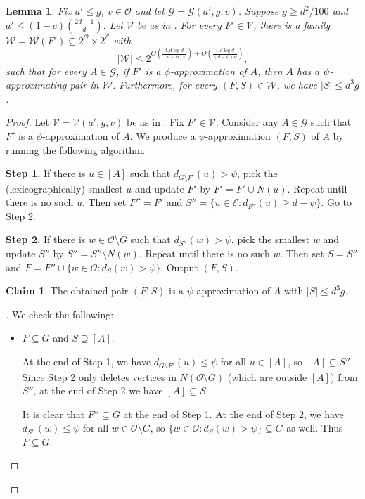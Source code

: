 \documentclass{amsart}
\newenvironment{subproof}[1][\proofname]{
  \renewcommand{\qedsymbol}{$\blacksquare$}
  \begin{proof}[#1]
}{
  \end{proof}
}
\newtheorem{lem}[thm]{Lemma}
\theoremstyle{definition}
\newtheorem{claim}[thm]{Claim}
\newcommand{\cO}{\mathcal{O} }
\newcommand{\cE}{\mathcal{E} }
\newcommand{\cG}{\mathcal{G} }
\newcommand{\cV}{\mathcal{V} }
\newcommand{\cW}{\mathcal{W} }
\newcommand{\0}[0]{\emptyset}
\begin{document}
\begin{lem}\label{lem:psi-approx}
Fix $a'\leq g$, $v\in\cO$ and let $\cG=\cG(a',g,v)$.
Suppose $g\geq d^2/100$ and $a'\leq (1-c)\binom{2d-1}{d}$.
Let $\cV$ be as in . For every $F'\in\mathcal V$, there is a family $\mathcal W=\mathcal W(F')\subseteq 2^{\cO}\times 2^\cE$ with
    \[
    |\mathcal W|\leq 2^{O\left(\frac{t_1d\log d}{(d-\phi)\psi}\right)+O\left(\frac{t_1d\log d}{(d-\psi)\psi}\right)},
    \]
    such that for every $A\in\mathcal G$, if $F'$ is a $\phi$-approximation of $A$, then $A$ has a $\psi$-approximating pair in $\mathcal W$. Furthermore, for every $(F,S)\in\cW$, we have $|S|\leq d^3g$.
\end{lem}
\begin{proof}
Let $\cV=\cV(a',g,v)$ be as in . Fix $F'\in\cV$. Consider any $A\in\cG$ such that $F'$ is a $\phi$-approximation of $A$. We produce a $\psi$-approximation $(F,S)$ of $A$ by running the following algorithm.

\textbf{Step 1.} If there is $u\in[A]$ such that $d_{G\setminus F'}(u)>\psi$, pick the (lexicographically) smallest $u$ and update $F'$ by $F'=F'\cup N(u)$. Repeat until there is no such $u$. Then set $F''=F'$ and $S''=\{u\in \cE:d_{F''}(u)\geq d-\psi\}$. Go to Step 2. 

\textbf{Step 2.} If there is $w\in \cO\setminus G$ such that $d_{S''}(w)>\psi$, pick the smallest $w$ and update $S''$ by $S''=S''\setminus N(w)$. Repeat until there is no such $w$. Then set $S=S''$ and $F=F''\cup \{w\in \cO: d_{S}(w)>\psi\}$. Output $(F,S)$.

\begin{claim}\label{claim:psi-1}
    The obtained pair $(F,S)$ is a $\psi$-approximation of $A$ with $|S|\leq d^3g$.
\end{claim}
\begin{subproof}
    We check the following:
    \begin{itemize}
        \item $F\subseteq G$ and $S\supseteq[A]$. 
        
        At the end of Step 1, we have $d_{G\setminus F'}(u)\leq \psi$ for all $u\in[A]$, so $[A]\subseteq S''$. Since Step 2 only deletes vertices in $N(\cO\setminus G)$ (which are outside $[A]$) from $S''$, at the end of Step 2 we have $[A]\subseteq S$.

        It is clear that $F''\subseteq G$ at the end of Step 1. At the end of Step 2, we have $d_{S''}(w)\leq\psi$ for all $w\in\cO\setminus G$, so $\{w\in \cO: d_{S}(w)>\psi\}\subseteq G$ as well. Thus $F\subseteq G$. 
        

\end{itemize}
\end{subproof}
\end{proof}
\end{document}

